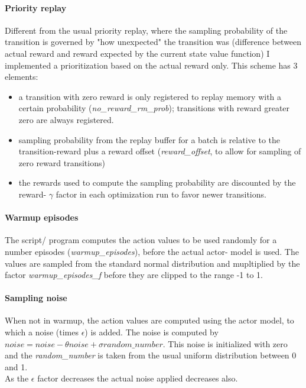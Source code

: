 \documentclass[a4paper]{article}
\begin{document}
\paragraph{Priority replay}
Different from the usual priority replay, where the sampling probability of the
transition is governed by "how unexpected" the transition was (difference between
actual reward and reward expected by the current state value function) I implemented
a prioritization based on the actual reward only. This scheme has 3 elements:
\begin{itemize}
\item a transition with zero reward is only registered to replay memory
with a certain probability (\textit{no\_reward\_rm\_prob});
transitions with reward greater zero are always registered.
\item sampling probability from the replay buffer for a batch is relative
to the transition-reward plus a reward offset (\textit{reward\_offset}, to allow
for sampling of zero reward transitions)
\item the rewards used to compute the sampling probability are discounted by
the reward- $\gamma$ factor in each optimization run to favor newer transitions.
\end{itemize}

\paragraph{Warmup episodes}
The script/ program computes the action values to be used randomly for
a number episodes (\textit{warmup\_episodes}), before the actual actor- model
is used. The values are sampled from the standard normal distribution and
mupltiplied by the factor \textit{warmup\_episodes\_f} before they are clipped
to the range -1 to 1.

\paragraph{Sampling noise}
When not in warmup, the action values are computed using the actor model,
to which a noise (times $\epsilon$) is added. The noise is computed by
$noise = noise -\theta noise + \sigma random\_number$. This noise is
initialized with zero and the \textit{random\_number} is taken from the
usual uniform distribution between 0 and 1.
\\
As the $\epsilon$ factor decreases the actual noise applied decreases also.
\end{document}
